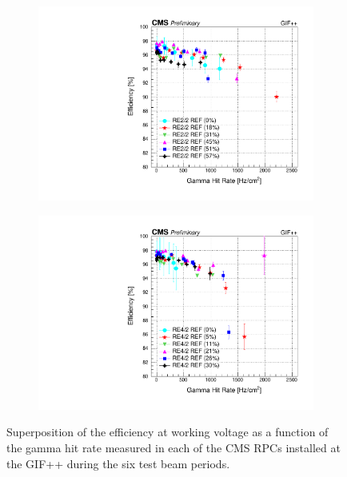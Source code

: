 \begin{figure}[H]
\begin{subfigure}{0.5\linewidth}
    		\includegraphics[width = \linewidth]{fig/chapt5/RE2-2_REF_Efficiency_vs_Rate.pdf}
        	\caption{\label{fig:GIFpp_eff_vs_rate:C}}
    	\end{subfigure}
    	\begin{subfigure}{0.5\linewidth}
			\centering
    		\includegraphics[width = \linewidth]{fig/chapt5/RE4-2_REF_Efficiency_vs_Rate.pdf}
        	\caption{\label{fig:GIFpp_eff_vs_rate:D}}
    	\end{subfigure}
		\caption{\label{fig:GIFpp_eff_vs_rate} Superposition of the efficiency at working voltage as a function of the gamma hit rate measured in each of the CMS RPCs installed at the GIF++ during the six test beam periods.}
	\end{figure}
	
